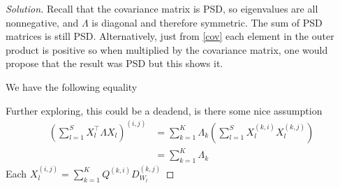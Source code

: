 \begin{note}


\begin{proof}[Solution]

Recall that the covariance matrix is PSD, so eigenvalues are all nonnegative, and $\Lambda$ is diagonal and therefore symmetric.
The sum of PSD matrices is still PSD. Alternatively, just from \ref{cov} each element in the outer product is positive 
so when multiplied by the covariance matrix, one would propose that the result was PSD but this shows it. 

\hfill

We have the following equality

Further exploring, this could be a deadend, is there some nice assumption
\begin{align*}
    \left( \sum_{l=1}^S X_l^\top \Lambda X_l \right)^{(i, j)} &= \sum_{k=1}^K \Lambda_k \left(\sum_{l=1}^S X_l^{(k, i)} X_l^{(k, j)}\right)\\
    &= \sum_{k=1}^K \Lambda_k 
\end{align*}
Each $X_l^{(i, j)} = \sum_{k=1}^K Q^{(k, i)} D_{W_l}^{(k, j)} $
\end{proof}
\end{note}

